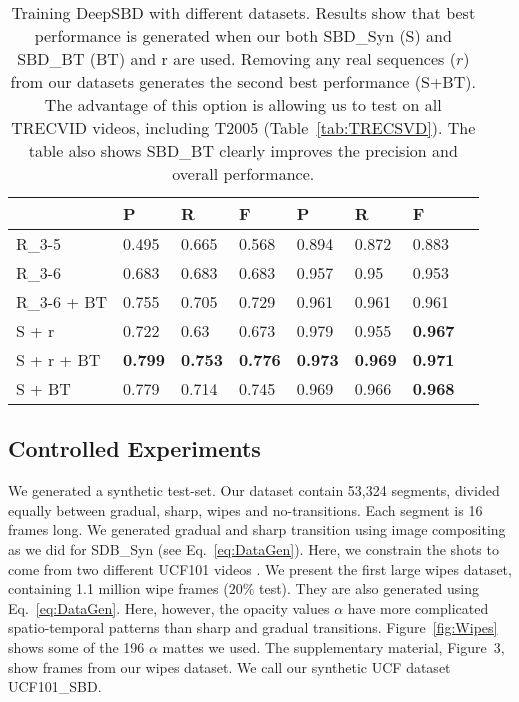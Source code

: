 \documentclass[journal]{IEEEtran}
\begin{document}
\begin{table}
\small
\centering
\begin{tabular}{| l | l | l | l | l | l | l| l| }
     \hline              
												    &   P   & R  &  F & P    & R      & F       \\
     \hline


\hline
	      R\_3-5   		   & 0.495  & 0.665	& 0.568	& 0.894 	& 0.872	& 	0.883 \\
				\hline
				R\_3-6         & 0.683	& 0.683	& 0.683	& 0.957	& 0.95	& 0.953	 \\
				 \hline
				R\_3-6 + BT   & 0.755 & 0.705 & 0.729 & 0.961 & 0.961 & 0.961 \\
				\hline
				S + r         & 0.722 & 0.63 & 0.673 & 0.979 & 0.955 & \textbf{0.967} \\
        \hline
				S + r + BT    & \textbf{0.799} & \textbf{0.753} & \textbf{0.776} & \textbf{0.973} & \textbf{0.969} & \textbf{0.971}\\				
        \hline
			  S + BT     & 0.779 & 0.714 & 0.745 & 0.969 & 0.966 & \textbf{0.968}\\	
				\hline
    \end{tabular}\vspace{3pt}
\caption{Training DeepSBD with different datasets. Results show that best performance is generated when our both SBD\_Syn (S) and SBD\_BT (BT) and r are used. Removing any real sequences ($r$) from our datasets generates the second best performance (S+BT). The advantage of this option is allowing us to test on all TRECVID videos, including T2005 (Table~\ref{tab:TRECSVD}). The table also shows SBD\_BT clearly improves the precision and overall performance.}
\label{tab:OurDataImpact}
\end{table}

\subsection{Controlled Experiments} 

We generated a synthetic test-set. Our dataset contain 53,324 segments, divided equally between gradual, sharp, wipes and no-transitions. Each segment is 16 frames long. We generated gradual and sharp transition using image compositing as we did for SDB\_Syn (see Eq.~\ref{eq:DataGen}). Here, we constrain the shots to come from two different UCF101 videos \cite{Soomro12}. We present the first large wipes dataset, containing 1.1 million wipe frames ($20\%$ test). They are also generated using Eq.~\ref{eq:DataGen}. Here, however, the opacity values $\alpha$ have more complicated spatio-temporal patterns than sharp and gradual transitions. Figure~\ref{fig:Wipes} shows some of the 196 $\alpha$ mattes we used. The supplementary material, Figure~3, show frames from our wipes dataset. We call our synthetic UCF dataset UCF101\_SBD.      
\end{document}

